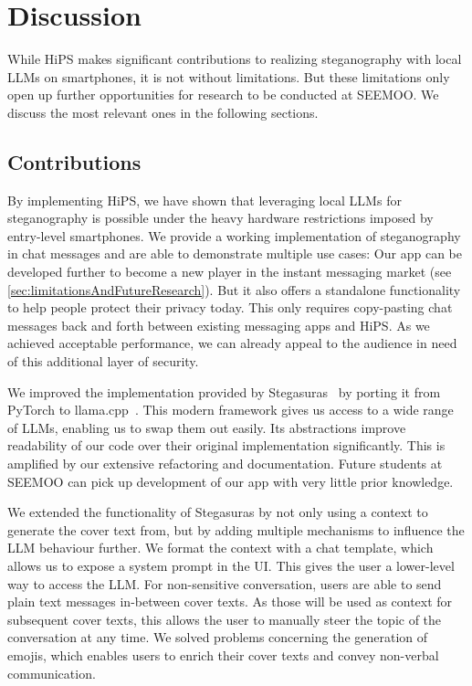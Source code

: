 
\chapter{Discussion}\label{ch:discussion} %
\glsresetall %

While \gls{HiPS} makes significant contributions to realizing steganography with local \glspl{LLM} on smartphones, it is not without limitations. But these limitations only open up further opportunities for research to be conducted at SEEMOO. We discuss the most relevant ones in the following sections.

\section{Contributions}
\label{sec:contributions}
By implementing \gls{HiPS}, we have shown that leveraging local \glspl{LLM} for steganography is possible under the heavy hardware restrictions imposed by entry-level smartphones. We provide a working implementation of steganography in chat messages and are able to demonstrate multiple use cases: Our app can be developed further to become a new player in the instant messaging market (see \cref{sec:limitationsAndFutureResearch}). But it also offers a standalone functionality to help people protect their privacy today. This only requires copy-pasting chat messages back and forth between existing messaging apps and \gls{HiPS}. As we achieved acceptable performance, we can already appeal to the audience in need of this additional layer of security.

We improved the implementation provided by Stegasuras~\cite{zieglerNeuralLinguisticSteganography2019} by porting it from PyTorch to llama.cpp~\cite{gerganovGgerganovLlamacpp2024}. This modern framework gives us access to a wide range of \glspl{LLM}, enabling us to swap them out easily. Its abstractions improve readability of our code over their original implementation significantly. This is amplified by our extensive refactoring and documentation. Future students at SEEMOO can pick up development of our app with very little prior knowledge.

We extended the functionality of Stegasuras by not only using a context to generate the cover text from, but by adding multiple mechanisms to influence the \gls{LLM} behaviour further. We format the context with a chat template, which allows us to expose a system prompt in the \gls{UI}. This gives the user a lower-level way to access the \gls{LLM}. For non-sensitive conversation, users are able to send plain text messages in-between cover texts. As those will be used as context for subsequent cover texts, this allows the user to manually steer the topic of the conversation at any time. We solved problems concerning the generation of emojis, which enables users to enrich their cover texts and convey non-verbal communication.

